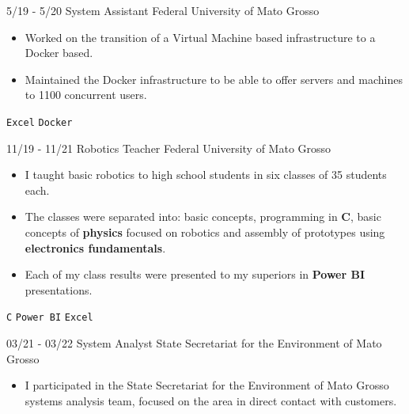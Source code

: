 \documentclass[9pt]{developercv} %
\begin{document}
\begin{entrylist}
	\entry
            {5/19 - 5/20}
		{\normalsize System Assistant}
		{\normalsize Federal University of Mato Grosso}
		{\vspace{-10pt}
        \vspace{2.5pt}
        \begin{itemize}[noitemsep,topsep=0pt,parsep=0pt,partopsep=0pt, leftmargin=-1pt]
            \item {Worked on the transition of a Virtual Machine based infrastructure to a Docker based.}
            \vspace{2.5pt}
            \item {Maintained the Docker infrastructure to be able to offer servers and machines to 1100 concurrent users.}
        \end{itemize} 
        \texttt{Excel} \slashsep \texttt{Docker}}
	\entry
            {11/19 - 11/21}
		{\normalsize Robotics Teacher}
		{\normalsize Federal University of Mato Grosso}
		{\vspace{-10pt}
        \vspace{2.5pt}
        \begin{itemize}[noitemsep,topsep=0pt,parsep=0pt,partopsep=0pt, leftmargin=-1pt]
            \item {I taught basic robotics to high school students in six classes of 35 students each.}
            \vspace{2.5pt}
            \item {The classes were separated into: basic concepts, programming in \textbf{C}, basic 
            concepts of \textbf{physics} focused on robotics and assembly of prototypes using \textbf{electronics fundamentals}.}
            \vspace{2.5pt}
            \item {Each of my class results were presented to my superiors in \textbf{Power BI} presentations.}
        \end{itemize} 
        \texttt{C} \slashsep \texttt{Power BI} \slashsep \texttt{Excel}}
        \entry
		{03/21 - 03/22}
		{\normalsize System Analyst}
		{\normalsize State Secretariat for the Environment of Mato Grosso}
		{\vspace{-10pt}
        \vspace{2.5pt}
        \begin{itemize}[noitemsep,topsep=0pt,parsep=0pt,partopsep=0pt, leftmargin=-1pt]
            \item {I participated in the State Secretariat for the Environment of Mato Grosso systems analysis team, focused on the area in direct contact with customers.}

\end{itemize}}
\end{entrylist}
\end{document}
